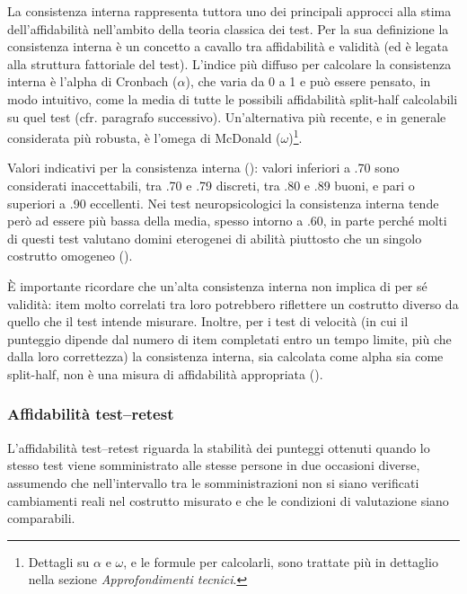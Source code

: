 \documentclass[
  italian,
  letterpaper,
  paper=A4,
  headinclude=on,
  footinclude=on,
  12pt]{scrbook}
\begin{document}
La consistenza interna rappresenta tuttora uno dei principali approcci
alla stima dell'affidabilità nell'ambito della teoria classica dei test.
Per la sua definizione la consistenza interna è un concetto a cavallo
tra affidabilità e validità (ed è legata alla struttura fattoriale del
test). L'indice più diffuso per calcolare la consistenza interna è
l'alpha di Cronbach (\(\alpha\)), che varia da 0 a 1 e può essere
pensato, in modo intuitivo, come la media di tutte le possibili
affidabilità split-half calcolabili su quel test (cfr. paragrafo
successivo). Un'alternativa più recente, e in generale considerata più
robusta, è l'omega di McDonald (\(\omega\))\footnote{Dettagli su
  \(\alpha\) e \(\omega\), e le formule per calcolarli, sono trattate
  più in dettaglio nella sezione \emph{Approfondimenti tecnici}.}.

Valori indicativi per la consistenza interna
(\cite{slick2006psychometrics}): valori inferiori a .70 sono considerati
inaccettabili, tra .70 e .79 discreti, tra .80 e .89 buoni, e pari o
superiori a .90 eccellenti. Nei test neuropsicologici la consistenza
interna tende però ad essere più bassa della media, spesso intorno a
.60, in parte perché molti di questi test valutano domini eterogenei di
abilità piuttosto che un singolo costrutto omogeneo
(\cite{slick2006psychometrics}).

È importante ricordare che un'alta consistenza interna non implica di
per sé validità: item molto correlati tra loro potrebbero riflettere un
costrutto diverso da quello che il test intende misurare. Inoltre, per i
test di velocità (in cui il punteggio dipende dal numero di item
completati entro un tempo limite, più che dalla loro correttezza) la
consistenza interna, sia calcolata come alpha sia come split-half, non è
una misura di affidabilità appropriata (\cite{slick2006psychometrics}).

\subsubsection{Affidabilità
test--retest}\label{affidabilituxe0-testretest}

\begin{tcolorbox}[enhanced jigsaw, left=2mm, colbacktitle=quarto-callout-note-color!10!white, bottomrule=.15mm, opacityback=0, coltitle=black, colframe=quarto-callout-note-color-frame, opacitybacktitle=0.6, leftrule=.75mm, colback=white, toprule=.15mm, title=\textcolor{quarto-callout-note-color}{\faInfo}\hspace{0.5em}{Definizione}, titlerule=0mm, arc=.35mm, breakable, rightrule=.15mm, bottomtitle=1mm, toptitle=1mm]

L'affidabilità test--retest riguarda la stabilità dei punteggi ottenuti
quando lo stesso test viene somministrato alle stesse persone in due
occasioni diverse, assumendo che nell'intervallo tra le somministrazioni
non si siano verificati cambiamenti reali nel costrutto misurato e che
le condizioni di valutazione siano comparabili.

\end{tcolorbox}
\end{document}
